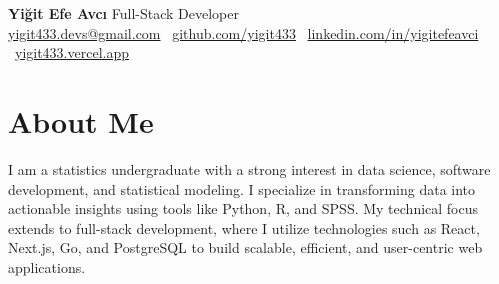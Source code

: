 \documentclass[10pt,a4paper]{extarticle}
\begin{document}
\begin{center}
    \begin{minipage}{\textwidth}
        \centering
        {\LARGE\textbf{Yiğit Efe Avcı}} \hspace{2pt} {\LARGE{Full-Stack Developer}}\\[10pt]
        \href{mailto:yigit433.devs@gmail.com}{yigit433.devs@gmail.com} \textbullet\
        \href{https://github.com/yigit433}{github.com/yigit433} \textbullet\
        \href{https://linkedin.com/in/yigitefeavci}{linkedin.com/in/yigitefeavci} \textbullet\
        \href{https://yigit433.vercel.app}{yigit433.vercel.app}
    \end{minipage}
\end{center}
\section{About Me}
I am a statistics undergraduate with a strong interest in data science, software development, and statistical modeling. I specialize in transforming data into actionable insights using tools like Python, R, and SPSS. My technical focus extends to full-stack development, where I utilize technologies such as React, Next.js, Go, and PostgreSQL to build scalable, efficient, and user-centric web applications.
\end{document}
